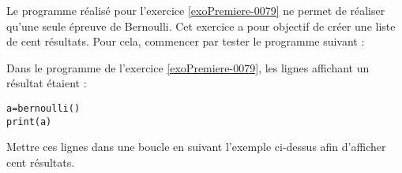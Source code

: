 
\begin{exercice}\label{exoPremiere-0080}

    Le programme réalisé pour l'exercice \ref{exoPremiere-0079} ne permet de réaliser qu'une seule épreuve de Bernoulli. Cet exercice a pour objectif de créer une liste de cent résultats. Pour cela, commencer par tester le programme suivant :
    


Dans le programme de l'exercice \ref{exoPremiere-0079}, les lignes affichant un résultat étaient :
\begin{verbatim}
a=bernoulli()
print(a)
\end{verbatim}
Mettre ces lignes dans une boucle  en suivant l'exemple ci-dessus afin d'afficher cent résultats.

\end{exercice}
